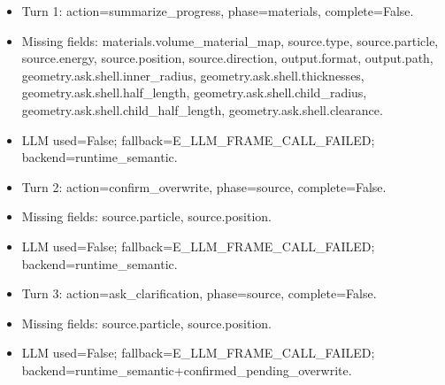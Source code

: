 \documentclass[11pt]{ctexart}
\begin{document}
\begin{itemize}
\item Turn 1: action=summarize\_progress, phase=materials, complete=False.
\item Missing fields: materials.volume\_material\_map, source.type, source.particle, source.energy, source.position, source.direction, output.format, output.path, geometry.ask.shell.inner\_radius, geometry.ask.shell.thicknesses, geometry.ask.shell.half\_length, geometry.ask.shell.child\_radius, geometry.ask.shell.child\_half\_length, geometry.ask.shell.clearance.
\item LLM used=False; fallback=E\_LLM\_FRAME\_CALL\_FAILED; backend=runtime\_semantic.
\item Turn 2: action=confirm\_overwrite, phase=source, complete=False.
\item Missing fields: source.particle, source.position.
\item LLM used=False; fallback=E\_LLM\_FRAME\_CALL\_FAILED; backend=runtime\_semantic.
\item Turn 3: action=ask\_clarification, phase=source, complete=False.
\item Missing fields: source.particle, source.position.
\item LLM used=False; fallback=E\_LLM\_FRAME\_CALL\_FAILED; backend=runtime\_semantic+confirmed\_pending\_overwrite.
\end{itemize}
\end{document}
